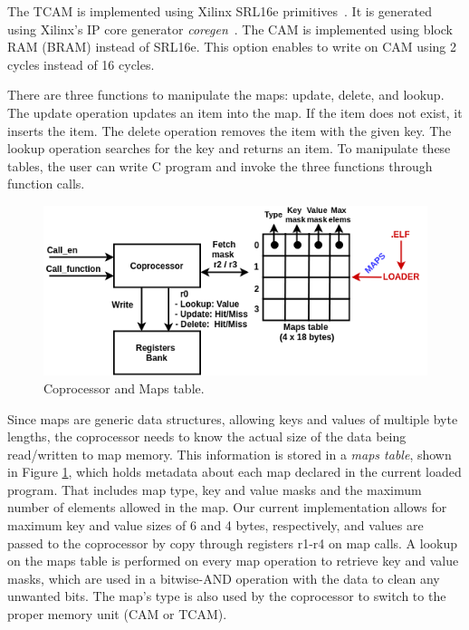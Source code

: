 The TCAM is implemented using Xilinx SRL16e primitives~\cite{xilinx_kylelocke2011}.
It is generated using Xilinx's IP core generator \textit{coregen}~\cite{xilinx_core_generator_2018}. The CAM is implemented using block RAM (BRAM) instead of SRL16e. This option enables to write on CAM using 2 cycles instead of 16 cycles.

There are three functions to manipulate the maps: update, delete, and lookup. The update operation updates an item into the map. If the item does not exist, it inserts the item. The delete operation removes the item with the given key. The lookup operation searches for the key and returns an item.
To manipulate these tables, the user can write C program and invoke the three functions through function calls.

\begin{figure}[ht]
\centering
\includegraphics[width=1.\linewidth]{figures/coprocessor.png}
\caption{Coprocessor and Maps table.}
\label{fig:coproc}
\end{figure}

\color{blue}
Since maps are generic data structures, allowing keys and values of multiple byte lengths, the coprocessor needs to know the actual size of the data being read/written to map memory. This information is stored in a \textit{maps table}, shown in Figure \ref{fig:coproc}, which holds metadata about each map declared in the current loaded program. That includes map type, key and value masks and the maximum number of elements allowed in the map. Our current implementation allows for maximum key and value sizes of 6 and 4 bytes, respectively, and values are passed to the coprocessor by copy through registers r1-r4 on map calls. A lookup on the maps table is performed on every map operation to retrieve key and value masks, which are used in a bitwise-AND operation with the data to clean any unwanted bits. The map's type is also used by the coprocessor to switch to the proper memory unit (CAM or TCAM).
\color{black}

